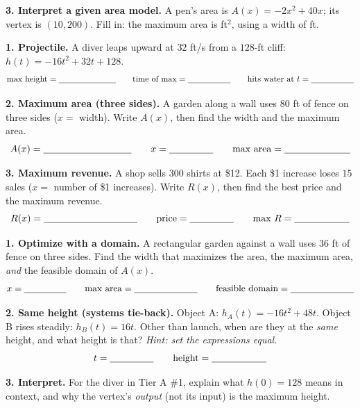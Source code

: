\documentclass[10pt]{article}
\begin{document}
\begin{tcolorbox}[colback=white, colframe=black!40, title=\textbf{Tier R --- Remediate},
    fonttitle=\bfseries, arc=1.5mm, left=3mm, right=3mm, top=2mm, bottom=2mm, breakable]
\textbf{3. Interpret a given area model.} A pen's area is $A(x)=-2x^2+40x$; its vertex is $(10,200)$. Fill in:
the maximum area is \blank{1.8cm} ft$^2$, using a width of \blank{1.4cm} ft.
\end{tcolorbox}

\begin{tcolorbox}[colback=white, colframe=black!40, title=\textbf{Tier A --- Approaching Proficiency},
    fonttitle=\bfseries, arc=1.5mm, left=3mm, right=3mm, top=2mm, bottom=2mm, breakable]
\textbf{1. Projectile.} A diver leaps upward at $32$ ft/s from a $128$-ft cliff: $h(t)=-16t^2+32t+128$.
\[ \text{max height} = \blank{2.4cm} \qquad \text{time of max} = \blank{1.8cm} \qquad \text{hits water at } t=\blank{1.8cm} \]

\textbf{2. Maximum area (three sides).} A garden along a wall uses $80$ ft of fence on three sides ($x=$ width).
Write $A(x)$, then find the width and the maximum area.
\[ A(x)=\blank{3.2cm} \qquad x=\blank{1.6cm} \qquad \text{max area}=\blank{2.4cm} \]

\textbf{3. Maximum revenue.} A shop sells $300$ shirts at \$12. Each \$1 increase loses $15$ sales
($x=$ number of \$1 increases). Write $R(x)$, then find the best price and the maximum revenue.
\[ R(x)=\blank{3.4cm} \qquad \text{price}=\blank{1.6cm} \qquad \text{max }R=\blank{2.0cm} \]
\end{tcolorbox}

\begin{tcolorbox}[colback=white, colframe=black!40, title=\textbf{Tier E --- Extension},
    fonttitle=\bfseries, arc=1.5mm, left=3mm, right=3mm, top=2mm, bottom=2mm, breakable]
\textbf{1. Optimize with a domain.} A rectangular garden against a wall uses $36$ ft of fence on three sides. Find the
width that maximizes the area, the maximum area, \emph{and} the feasible domain of $A(x)$.
\[ x=\blank{1.6cm} \qquad \text{max area}=\blank{2.4cm} \qquad \text{feasible domain}=\blank{2.4cm} \]

\textbf{2. Same height (systems tie-back).} Object A: $h_A(t)=-16t^2+48t$. Object B rises steadily: $h_B(t)=16t$.
Other than launch, when are they at the \emph{same} height, and what height is that? \emph{Hint: set the expressions equal.}
\[ t=\blank{1.6cm} \qquad \text{height}=\blank{2.0cm} \]

\textbf{3. Interpret.} For the diver in Tier A \#1, explain what $h(0)=128$ means in context, and why the vertex's
\emph{output} (not its input) is the maximum height.
\end{tcolorbox}
\end{document}
